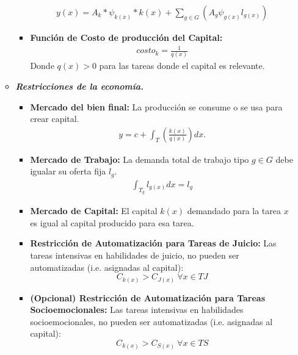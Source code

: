 \documentclass{article}
\theoremstyle{remark}
\theoremstyle{definition}
\begin{document}
\begin{enumerate}
\begin{tcolorbox}[title= Soluci\'on 3]
\begin{itemize}
\begin{itemize}
                        \begin{align*}
                            y(x)=A_k*\psi_{k(x)}*k(x) + \sum_{g \in G}\left(A_g\psi_{g(x)}l_{g(x)}\right)
                        \end{align*}
                        \item \textbf{Funci\'on de Costo de producci\'on del Capital:}
                        \begin{align*}
                            costo_k = \frac{1}{q(x)}
                        \end{align*}
                        Donde $q(x)>0$ para las tareas donde el capital es relevante.
                    \end{itemize}
                \item {\textbf{\textit{Restricciones de la econom\'ia.}}}
                    \begin{itemize}
                        \item \textbf{Mercado del bien final:} La producci\'on se consume o se usa para crear capital.
                            \begin{align*}
                                y = c+\int_T\left(\frac{k(x)}{q(x)}\right)dx.
                            \end{align*}
                        \item \textbf{Mercado de Trabajo:} La demanda total de trabajo tipo $g\in G$ debe igualar su oferta fija $l_g$.
                            \begin{align*}
                                \int_{T_g} l_{g(x)} dx = l_g
                            \end{align*}
                        \item \textbf{Mercado de Capital:} El capital $k(x)$ demandado para la tarea $x$ es igual al capital producido para esa tarea.
                        \item \textbf{Restricci\'on de Automatizaci\'on para Tareas de Juicio:} Las tareas intensivas en habilidades de juicio, no pueden ser automatizadas (i.e. asignadas al capital):
                        $$C_{k(x)} > C_{J(x)} \ \forall x \in TJ$$
                        \item \textbf{(Opcional) Restricci\'on de Automatizaci\'on para Tareas Socioemocionales:} Las tareas intensivas en habilidades socioemocionales, no pueden ser automatizadas (i.e. asignadas al capital):
                        $$C_{k(x)} > C_{S(x)} \ \forall x \in TS$$
                    \end{itemize}
            \end{itemize}
        \end{tcolorbox}
    

\end{enumerate}
\end{document}
